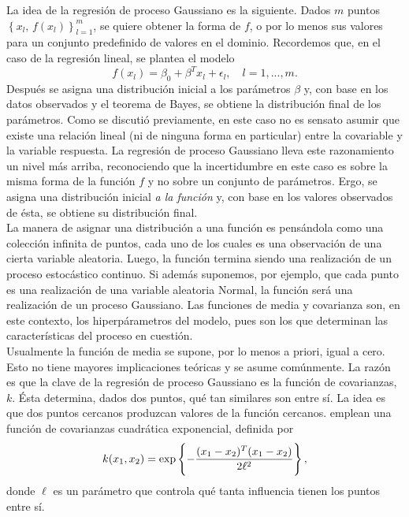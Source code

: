 La idea de la regresión de proceso Gaussiano es la siguiente. Dados $m$ puntos $\left\{ x_l, \, f(x_l) \right\}_{l=1}^{m}$, se quiere obtener la forma de $f$, o por lo menos sus valores para un conjunto predefinido de valores en el dominio. Recordemos que, en el caso de la regresión lineal, se plantea el modelo
\begin{equation*}
	f(x_l) = \beta_0 + \beta^T x_l + \epsilon_l, \quad l=1,...,m.
\end{equation*}
Después se asigna una distribución inicial a los parámetros $\beta$ y, con base en los datos observados y el teorema de Bayes, se obtiene la distribución final de los parámetros. Como se discutió previamente, en este caso no es sensato asumir que existe una relación lineal (ni de ninguna forma en particular) entre la covariable y la variable respuesta. La regresión de proceso Gaussiano lleva este razonamiento un nivel más arriba, reconociendo que la incertidumbre en este caso es sobre la misma forma de la función $f$ y no sobre un conjunto de parámetros. Ergo, se asigna una distribución inicial \textit{a la función} y, con base en los valores observados de ésta, se obtiene su distribución final. \\


La manera de asignar una distribución a una función es pensándola como una colección infinita de puntos, cada uno de los cuales es una observación de una cierta variable aleatoria. Luego, la función termina siendo una realización de un proceso estocástico continuo. Si además suponemos, por ejemplo, que cada punto es una realización de una variable aleatoria Normal, la función será una realización de un proceso Gaussiano. Las funciones de media y covarianza son, en este contexto, los hiperpárametros del modelo, pues son los que determinan las características del proceso en cuestión. \\


Usualmente la función de media se supone, por lo menos a priori, igual a cero. Esto no tiene mayores implicaciones teóricas y se asume comúnmente. La razón es que la clave de la regresión de proceso Gaussiano es la función de covarianzas, $k$. Ésta determina, dados dos puntos, qué tan similares son entre sí. La idea es que dos puntos cercanos produzcan valores de la función cercanos. \cite{Woods_ACE} emplean una función de covarianzas cuadrática exponencial, definida por
\begin{equation} \label{eq:sq_exp_correlation_matrix}
	k(x_1, x_2) = \mathrm{exp} \left\{ -\frac{ (x_1 - x_2)^T (x_1 - x_2) }{2 \ell^2} \right\},
\end{equation}
donde $\ell$ es un parámetro que controla qué tanta influencia tienen los puntos entre sí. \\


